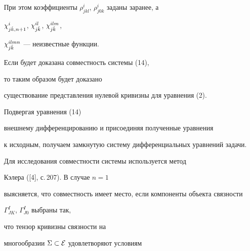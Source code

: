 При этом коэффициенты $\rho^i_{jkl}$, $\rho^i_{j0k}$ заданы заранее, а


$\chi^i_{j\Hat{k},n+1}$, $\chi^{il}_{j\Hat{k}}$, $\chi^{ilm}_{j\Hat{k}}$,


$\chi^{ilmn}_{j\Hat{k}}$ --- неизвестные функции.


Если будет доказана совместность системы (14),


то таким образом будет доказано


существование представления нулевой кривизны для уравнения (2).


Подвергая уравнения (14)


внешнему дифференцированию и присоединяя полученные уравнения


к исходным, получаем замкнутую систему дифференциальных уравнений задачи.





Для исследования совместности системы используется метод 


Кэлера ([4], с.\,207). В случае $n=1$


выясняется, что совместность имеет место, если компоненты объекта связности


$\Gamma^I_{JK}$, $\Gamma^I_{J0}$ выбраны так,


что тензор кривизны связности на


многообразии $\Sigma\subset\cal E$ удовлетворяют условиям


